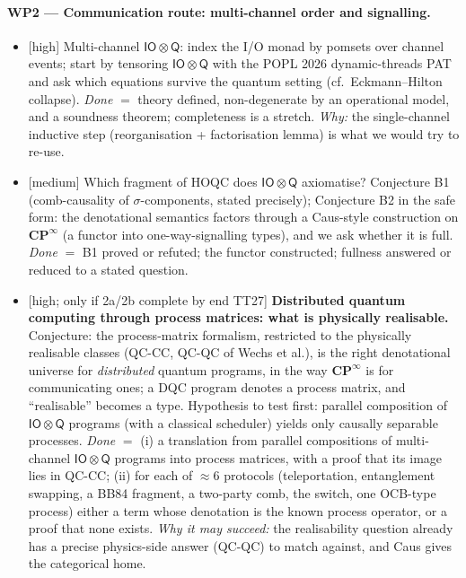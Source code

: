 \documentclass[11pt,a4paper]{article}
\newif\ifskeletonnotes
\newcommand{\skfill}[1]{\ifskeletonnotes{\color{orange!80!black}[FILL: #1]}\fi}
\newcommand{\risk}[1]{\textsf{\small[#1]}}
\newcommand{\WP}[1]{\textbf{WP#1}}
\newcommand{\iotq}{\mathsf{IO}\otimes\mathsf{Q}}   %
\newcommand{\CPinf}{\mathbf{CP}^{\infty}}
\begin{document}
\paragraph{\WP{2} --- Communication route: multi-channel order and signalling.}
\begin{itemize}[nosep]
\item[2a] \risk{high} Multi-channel $\iotq$: index the I/O monad by pomsets over channel events; start by tensoring $\iotq$ with the POPL 2026 dynamic-threads PAT and ask which equations survive the quantum setting (cf.\ Eckmann--Hilton collapse). \emph{Done} $=$ theory defined, non-degenerate by an operational model, and a soundness theorem; completeness is a stretch. \emph{Why:} the single-channel inductive step (reorganisation + factorisation lemma) is what we would try to re-use.
\item[2b] \risk{medium} Which fragment of HOQC does $\iotq$ axiomatise? Conjecture B1 (comb-causality of $\sigma$-components, stated precisely); Conjecture B2 in the safe form: the denotational semantics factors through a Caus-style construction on $\CPinf$ (a functor into one-way-signalling types), and we ask whether it is full. \emph{Done} $=$ B1 proved or refuted; the functor constructed; fullness answered or reduced to a stated question.
\item[2c] \risk{high; only if 2a/2b complete by end TT27} \textbf{Distributed quantum computing through process matrices: what is physically realisable.} Conjecture: the process-matrix formalism, restricted to the physically realisable classes (QC-CC, QC-QC of Wechs et al.), is the right denotational universe for \emph{distributed} quantum programs, in the way $\CPinf$ is for communicating ones; a DQC program denotes a process matrix, and ``realisable'' becomes a type. Hypothesis to test first: parallel composition of $\iotq$ programs (with a classical scheduler) yields only causally separable processes. \emph{Done} $=$ (i) a translation from parallel compositions of multi-channel $\iotq$ programs into process matrices, with a proof that its image lies in QC-CC; (ii) for each of $\approx$6 protocols (teleportation, entanglement swapping, a BB84 fragment, a two-party comb, the switch, one OCB-type process) either a term whose denotation is the known process operator, or a proof that none exists. \emph{Why it may succeed:} the realisability question already has a precise physics-side answer (QC-QC) to match against, and Caus gives the categorical home. \skfill{the Kim reference you had in mind for this item}

\end{itemize}
\end{document}
